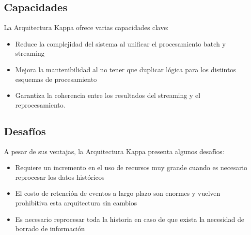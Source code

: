 \subsection{Capacidades}
La Arquitectura Kappa ofrece varias capacidades clave:
\begin{itemize}
    \item Reduce la complejidad del sistema al unificar el procesamiento batch y streaming
    \item Mejora la mantenibilidad al no tener que duplicar lógica para los distintos esquemas de procesamiento
    \item Garantiza la coherencia entre los resultados del streaming y el reprocesamiento.
\end{itemize}

\newpage
\subsection{Desafíos}
A pesar de sus ventajas, la Arquitectura Kappa presenta algunos desafíos:
\begin{itemize}
    \item Requiere un incremento en el uso de recursos muy grande cuando es necesario reprocesar los datos históricos
    \item El costo de retención de eventos a largo plazo son enormes y vuelven prohibitiva esta arquitectura sin cambios
    \item Es necesario reprocesar toda la historia en caso de que exista la necesidad de borrado de información
\end{itemize}


\newpage
